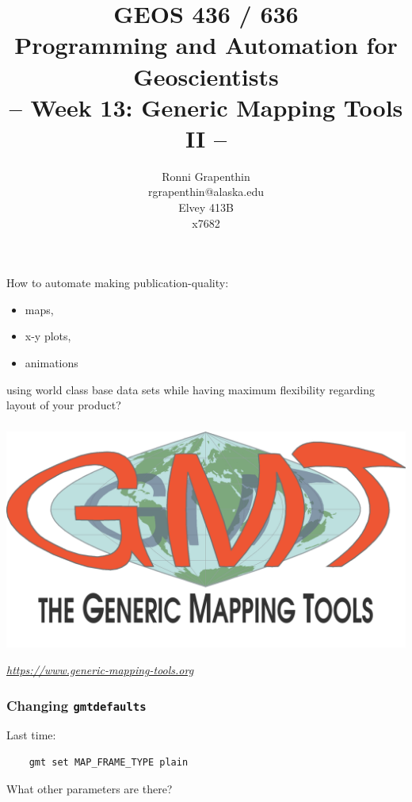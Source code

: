 \documentclass[unknownkeysallowed]{beamer}
\title[PAG]%
{GEOS 436 / 636\\
Programming and Automation for Geoscientists\\[20pt]
-- Week 13: Generic Mapping Tools II --
}
\author[Grapenthin]%
{Ronni Grapenthin\\
rgrapenthin@alaska.edu\\
Elvey 413B\\
x7682}
\institute[UAF] %
{}
\date[]{}
\begin{document}
\lstset{numbers=left, numberstyle=\tiny, stepnumber=2, basicstyle=\ttfamily, numbersep=5pt, xleftmargin=10pt}


	\begin{frame}
	\begin{center}
		\titlepage
	\end{center}
	\end{frame}


\begin{frame}
\frametitle{}
	How to automate making publication-quality:

	\begin{itemize}
		\item maps,
		\item x-y plots, 
		\item animations 
	\end{itemize}

	using world class base data sets while having maximum flexibility regarding layout of your product?
\end{frame}


\begin{frame}
\frametitle{}
	\begin{center}
		\includegraphics[width=.8\textwidth]{../figures/gmt-logo.png}	
	\end{center}
	\begin{flushright}
	\tiny{\emph{\url{https://www.generic-mapping-tools.org}}}
	\end{flushright}	
\end{frame}

\begin{frame}[fragile=singleslide]
\frametitle{Changing {\tt gmtdefaults}}
	Last time:
\begin{verbatim}
	gmt set MAP_FRAME_TYPE plain
\end{verbatim}		
	What other parameters are there?
\end{frame}
\end{document}
